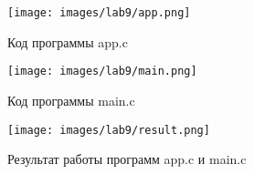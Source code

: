 \documentclass[14pt, a4paper]{article}
\begin{document}
    \begin{figure}[H]
        \centering
        \texttt{[image: images/lab9/app.png]}
        \caption{Код программы app.c}
    \end{figure}

    \begin{figure}[H]
        \centering
        \texttt{[image: images/lab9/main.png]}
        \caption{Код программы main.c}
    \end{figure}

    \begin{figure}[H]
        \centering
        \texttt{[image: images/lab9/result.png]}
        \caption{Результат работы программ app.c и main.c}
    \end{figure}

    \newpage
    
\end{document}
